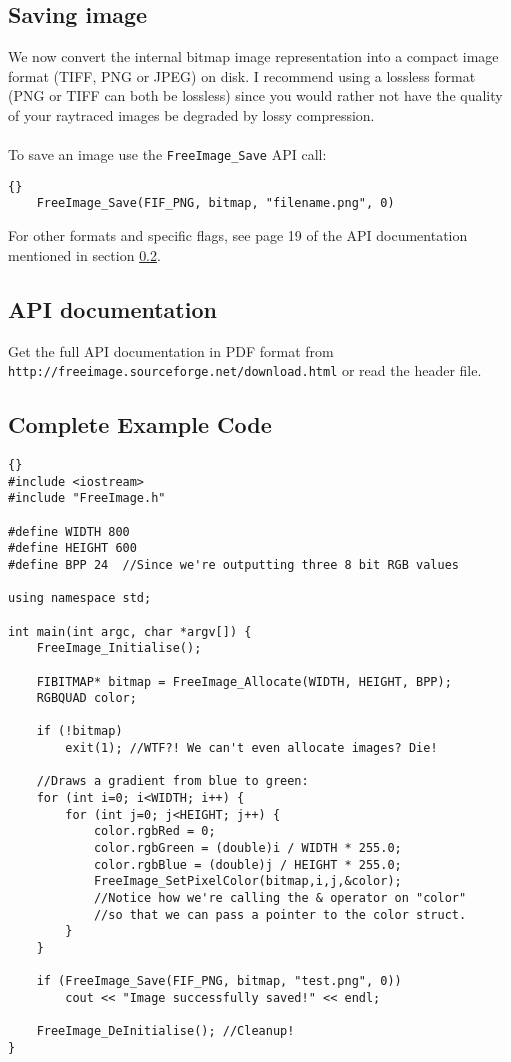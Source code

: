 \documentclass[]{article}
\begin{document}
\subsection{Saving image}

We now convert the internal bitmap image representation into a compact image format (TIFF, PNG or JPEG) on disk. I recommend using a lossless format (PNG or TIFF can both be lossless) since you would rather not have the quality of your raytraced images be degraded by lossy compression. 
\\
\\To save an image use the \verb=FreeImage_Save= API call:
\lstset{language=c++}
\lstset{commentstyle=\textit}
\begin{lstlisting}[frame=trbl]{}
    FreeImage_Save(FIF_PNG, bitmap, "filename.png", 0)
\end{lstlisting}
For other formats and specific flags, see page 19 of the API documentation mentioned in section \ref{api}.

\subsection{API documentation}\label{api}

Get the full API documentation in PDF format from \verb=http://freeimage.sourceforge.net/download.html= or read the header file.

\subsection{Complete Example Code}

\lstset{language=c++}
\lstset{commentstyle=\textit}
\begin{lstlisting}[frame=TRBL,caption=Everything you need for pixel-level PNG output,label=lstComplete]{}
#include <iostream>
#include "FreeImage.h"

#define WIDTH 800
#define HEIGHT 600
#define BPP 24	//Since we're outputting three 8 bit RGB values

using namespace std;

int main(int argc, char *argv[]) {
	FreeImage_Initialise();
	
	FIBITMAP* bitmap = FreeImage_Allocate(WIDTH, HEIGHT, BPP);
	RGBQUAD color;
	
	if (!bitmap)
		exit(1); //WTF?! We can't even allocate images? Die!
		
	//Draws a gradient from blue to green:
	for (int i=0; i<WIDTH; i++) {
		for (int j=0; j<HEIGHT; j++) {
			color.rgbRed = 0;
			color.rgbGreen = (double)i / WIDTH * 255.0;
			color.rgbBlue = (double)j / HEIGHT * 255.0;
			FreeImage_SetPixelColor(bitmap,i,j,&color);
			//Notice how we're calling the & operator on "color"
			//so that we can pass a pointer to the color struct.
		}
	}
		
	if (FreeImage_Save(FIF_PNG, bitmap, "test.png", 0))
		cout << "Image successfully saved!" << endl;
	
	FreeImage_DeInitialise(); //Cleanup!
}
\end{lstlisting}
\end{document}

